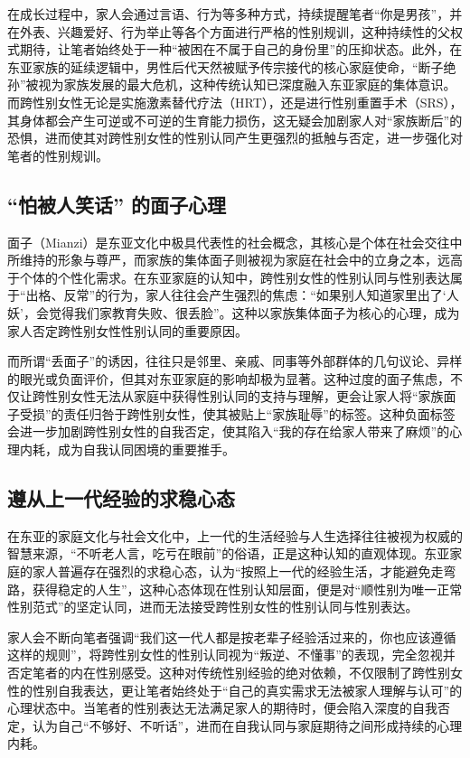 \documentclass[twocolumn]{ctexart}
\begin{document}
在成长过程中，家人会通过言语、行为等多种方式，持续提醒笔者“你是男孩”，并在外表、兴趣爱好、行为举止等各个方面进行严格的性别规训，这种持续性的父权式期待，让笔者始终处于一种“被困在不属于自己的身份里”的压抑状态。此外，在东亚家族的延续逻辑中，男性后代天然被赋予传宗接代的核心家庭使命，“断子绝孙”被视为家族发展的最大危机，这种传统认知已深度融入东亚家庭的集体意识。而跨性别女性无论是实施激素替代疗法（HRT），还是进行性别重置手术（SRS），其身体都会产生可逆或不可逆的生育能力损伤，这无疑会加剧家人对“家族断后”的恐惧，进而使其对跨性别女性的性别认同产生更强烈的抵触与否定，进一步强化对笔者的性别规训\cite{Gao2022hormone, pan2023gendertrouble, beitongtranscare}。

\subsection {“怕被人笑话” 的面子心理}
面子（Mianzi）是东亚文化中极具代表性的社会概念，其核心是个体在社会交往中所维持的形象与尊严，而家族的集体面子则被视为家庭在社会中的立身之本，远高于个体的个性化需求。在东亚家庭的认知中，跨性别女性的性别认同与性别表达属于“出格、反常”的行为，家人往往会产生强烈的焦虑：“如果别人知道家里出了‘人妖’，会觉得我们家教育失败、很丢脸”。这种以家族集体面子为核心的心理，成为家人否定跨性别女性性别认同的重要原因。

而所谓“丢面子”的诱因，往往只是邻里、亲戚、同事等外部群体的几句议论、异样的眼光或负面评价，但其对东亚家庭的影响却极为显著。这种过度的面子焦虑，不仅让跨性别女性无法从家庭中获得性别认同的支持与理解，更会让家人将“家族面子受损”的责任归咎于跨性别女性，使其被贴上“家族耻辱”的标签。这种负面标签会进一步加剧跨性别女性的自我否定，使其陷入“我的存在给家人带来了麻烦”的心理内耗，成为自我认同困境的重要推手。

\subsection {遵从上一代经验的求稳心态}
在东亚的家庭文化与社会文化中，上一代的生活经验与人生选择往往被视为权威的智慧来源，“不听老人言，吃亏在眼前”的俗语，正是这种认知的直观体现。东亚家庭的家人普遍存在强烈的求稳心态，认为“按照上一代的经验生活，才能避免走弯路，获得稳定的人生”，这种心态体现在性别认知层面，便是对“顺性别为唯一正常性别范式”的坚定认同，进而无法接受跨性别女性的性别认同与性别表达。

家人会不断向笔者强调“我们这一代人都是按老辈子经验活过来的，你也应该遵循这样的规则”，将跨性别女性的性别认同视为“叛逆、不懂事”的表现，完全忽视并否定笔者的内在性别感受。这种对传统性别经验的绝对依赖，不仅限制了跨性别女性的性别自我表达，更让笔者始终处于“自己的真实需求无法被家人理解与认可”的心理状态中。当笔者的性别表达无法满足家人的期待时，便会陷入深度的自我否定，认为自己“不够好、不听话”，进而在自我认同与家庭期待之间形成持续的心理内耗。
\end{document}
